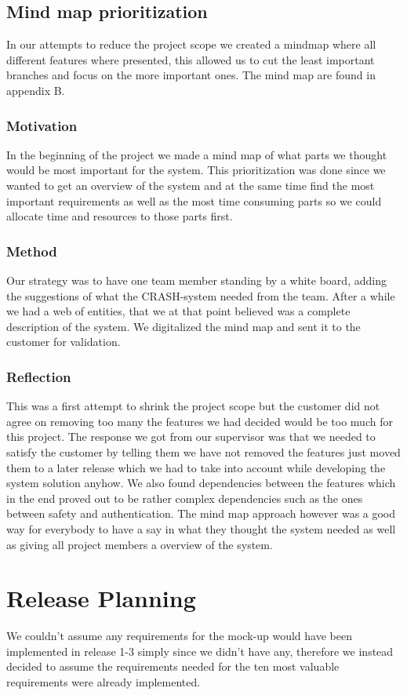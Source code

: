 \documentclass[10pt]{article}
\begin{document}
\subsection{Mind map prioritization}
\noindent In our attempts to reduce the project scope we created a mindmap where all different features where presented, this allowed us to cut the least important branches and focus on the more important ones. The mind map are found in appendix B.
\subsubsection{Motivation}
In the beginning of the project we made a mind map of what parts we thought would be most important for the system. This prioritization was done since we wanted to get an overview of the system and at the same time find the most important requirements as well as the most time consuming parts so we could allocate time and resources to those parts first.
\subsubsection{Method}
Our strategy was to have one team member standing by a white board, adding the suggestions of what the CRASH-system needed from the team. After a while we had a web of entities, that we at that point believed was a complete description of the system. We digitalized the mind map and sent it to the customer for validation. 
\subsubsection{Reflection}
This was a first attempt to shrink the project scope but the customer did not agree on removing too many the features we had decided would be too much for this project. The response we got from our supervisor was that we needed to satisfy the customer by telling them we have not removed the features just moved them to a later release which we had to take into account while developing the system solution anyhow.
We also found dependencies between the features which in the end proved out to be rather complex dependencies such as the ones between safety and authentication.
The mind map approach however was a good way for everybody to have a say in what they thought the system needed as well as giving all project members a overview of the system.

\section{Release Planning}
\noindent We couldn't assume any requirements for the mock-up would have been implemented in release 1-3 simply since we didn't have any, therefore we instead decided to assume the requirements needed for the ten most valuable requirements were already implemented.
\end{document}
